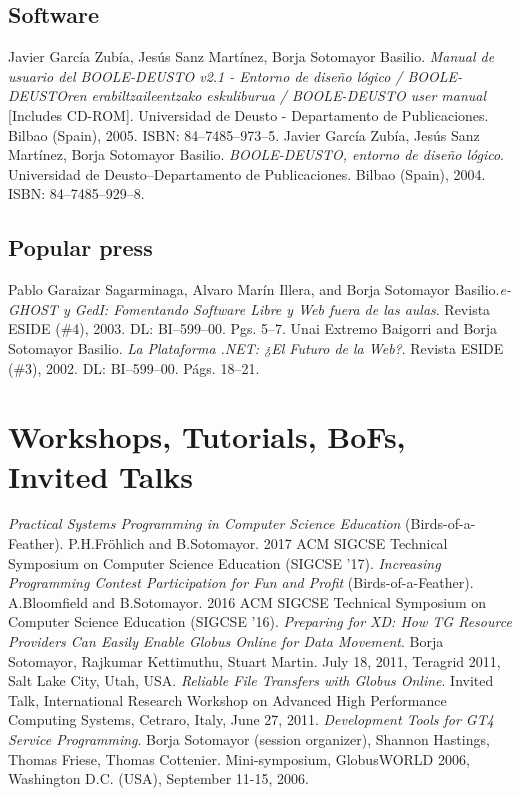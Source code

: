 \documentclass{resume}
\begin{document}
\subsection*{Software}
\begin{category}{}
\citembullet Javier García Zubía, Jesús Sanz Martínez, Borja Sotomayor Basilio. \emph{Manual de usuario del BOOLE-DEUSTO v2.1 - Entorno de diseño lógico / BOOLE-DEUSTOren erabiltzaileentzako eskuliburua / BOOLE-DEUSTO user manual} [Includes CD-ROM]. Universidad de Deusto - Departamento de Publicaciones. Bilbao (Spain), 2005. ISBN: 84--7485--973--5.
\citembullet Javier García Zubía, Jesús Sanz Martínez, Borja Sotomayor Basilio. \emph{BOOLE-DEUSTO, entorno de diseño lógico}. Universidad de Deusto--Departamento de Publicaciones. Bilbao (Spain), 2004. ISBN: 84--7485--929--8.
\end{category}


\subsection*{Popular press}
\begin{category}{}
\citembullet Pablo Garaizar Sagarminaga, Alvaro Marín Illera, and Borja Sotomayor Basilio.\emph{e-GHOST y GedI: Fomentando Software Libre y Web fuera de las aulas}. Revista ESIDE (\#4), 2003. DL: BI--599--00. Pgs. 5--7. 
\citembullet Unai Extremo Baigorri and Borja Sotomayor Basilio.
\emph{La Plataforma .NET: ¿El Futuro de la Web?}. Revista ESIDE
(\#3), 2002. DL: BI--599--00. Págs. 18--21.
\end{category}

\section*{\hspace{-1cm}Workshops, Tutorials, BoFs, Invited Talks}
\begin{category}{}
\citembullet \emph{Practical Systems Programming in Computer Science Education} (Birds-of-a-Feather). P.H.Fröhlich and B.Sotomayor. 2017 ACM SIGCSE Technical Symposium on Computer Science Education (SIGCSE '17).
\citembullet \emph{Increasing Programming Contest Participation for Fun and Profit} (Birds-of-a-Feather). A.Bloomfield and B.Sotomayor. 2016 ACM SIGCSE Technical Symposium on Computer Science Education (SIGCSE '16).
\citembullet \emph{Preparing for XD: How TG Resource Providers Can Easily Enable Globus Online for Data Movement}. Borja Sotomayor, Rajkumar Kettimuthu, Stuart Martin. July 18, 2011, Teragrid 2011, Salt Lake City, Utah, USA.
\citembullet \emph{Reliable File Transfers with Globus Online}. Invited Talk, International Research Workshop on Advanced High Performance Computing Systems, Cetraro, Italy, June 27, 2011.
\citembullet \emph{Development Tools for GT4 Service Programming}. Borja Sotomayor (session organizer), Shannon Hastings, Thomas Friese, Thomas Cottenier. Mini-symposium, GlobusWORLD 2006, Washington D.C. (USA), September 11-15, 2006.
\end{category}
\end{document}
